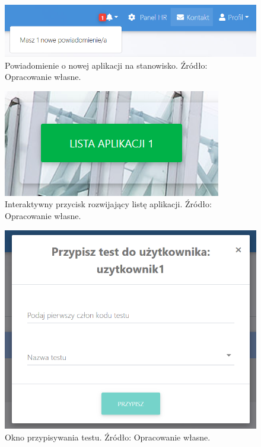 \documentclass[twoside]{projektInzynierskiMS}
\numberwithin{figure}{section}
\begin{document}
\begin{figure}[h!]
    \centering
    \includegraphics[scale=0.5]{images/powiadomienie.png}
    \caption{Powiadomienie o nowej aplikacji na stanowisko. Źródło: Opracowanie własne.}
    \label{fig:powiadomienie}
\end{figure}

\begin{figure}[h!]
    \centering
    \includegraphics[scale = 0.7]{images/listaAplikacjiPrzycisk.png}
    \caption{Interaktywny przycisk rozwijający listę aplikacji. Źródło: Opracowanie własne.}
    \label{fig:przycisk_listy_aplikacji}
\end{figure}

\begin{figure}[h!]
    \centering
    \includegraphics[scale = 0.5]{images/modalPrzypisywaniaTestu.png}
    \caption{Okno przypisywania testu. Źródło: Opracowanie własne.}
    \label{fig:okno_przypisywania_testu}
\end{figure}
\end{document}
